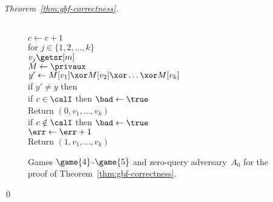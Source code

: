 \begin{proof}[Theorem~\ref{thm:gbf-correctness}]
\begin{figure}[tp]
{{\\
$c \gets c + 1$\\
for $j \in \{1,2,\ldots,k\}$\\
\nudge $v_j \getsr [m]$\\
%
$M \gets\privaux$\\
$y' \gets M[v_1] \xor M[v_2] \xor \ldots \xor M[v_k]$\\
if $y' \neq y$ then \\
\nudge if $c \in \calI$ then $\bad \gets \true$\\
\nudge Return $\left(0,v_1,\ldots,v_k\right)$\\
if $c \notin \calI$ then $\bad \gets \true$\\
$\err \gets \err +1$\\
Return $\left(1,v_1,\ldots,v_k\right)$
}
{
}
}
\caption{Games $\game{4}$-$\game{5}$ and zero-query adversary~$A_0$ for the
proof of Theorem~\ref{thm:gbf-correctness}.}
\label{fig:gbf-correctness-games2}
\end{figure}
\hfill\qed
\end{proof}
